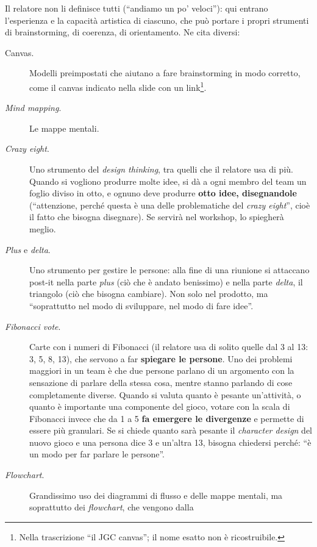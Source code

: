 Il relatore non li definisce tutti (``andiamo un po' veloci''): qui entrano
l'esperienza e la capacità artistica di ciascuno, che può portare i propri
strumenti di brainstorming, di coerenza, di orientamento. Ne cita
diversi:
\begin{description}
  \item[Canvas.] Modelli preimpostati che aiutano a fare brainstorming in modo
        corretto, come il canvas indicato nella slide con un
        link\footnote{Nella trascrizione ``il JGC canvas''; il nome esatto non è
        ricostruibile.}.
  \item[\emph{Mind mapping}.] Le mappe mentali.
  \item[\emph{Crazy eight}.] Uno strumento del \emph{design thinking}, tra quelli
        che il relatore usa di più. Quando si vogliono produrre molte idee, si
        dà a ogni membro del team un foglio diviso in otto, e ognuno deve
        produrre \textbf{otto idee, disegnandole} (``attenzione, perché questa è
        una delle problematiche del \emph{crazy eight}'', cioè il fatto che
        bisogna disegnare). Se servirà nel workshop, lo spiegherà meglio.
  \item[\emph{Plus} e \emph{delta}.] Uno strumento per gestire le persone:
        alla fine di una riunione si attaccano post-it nella parte \emph{plus}
        (ciò che è andato benissimo) e nella parte \emph{delta}, il triangolo
        (ciò che bisogna cambiare). Non solo nel prodotto, ma ``soprattutto nel
        modo di sviluppare, nel modo di fare idee''.
  \item[\emph{Fibonacci vote}.] Carte con i numeri di Fibonacci (il relatore usa
        di solito quelle dal 3 al 13: 3, 5, 8, 13), che servono a far
        \textbf{spiegare le persone}. Uno dei problemi maggiori in un team è che
        due persone parlano di un argomento con la sensazione di parlare della
        stessa cosa, mentre stanno parlando di cose completamente diverse.
        Quando si valuta quanto è pesante un'attività, o quanto è importante una
        componente del gioco, votare con la scala di Fibonacci invece che da 1 a
        5 \textbf{fa emergere le divergenze} e permette di essere più granulari.
        Se si chiede quanto sarà pesante il \emph{character design} del nuovo
        gioco e una persona dice 3 e un'altra 13, bisogna chiedersi perché: ``è
        un modo per far parlare le persone''.
  \item[\emph{Flowchart}.] Grandissimo uso dei diagrammi di flusso e delle mappe
        mentali, ma soprattutto dei \emph{flowchart}, che vengono dalla

\end{description}
